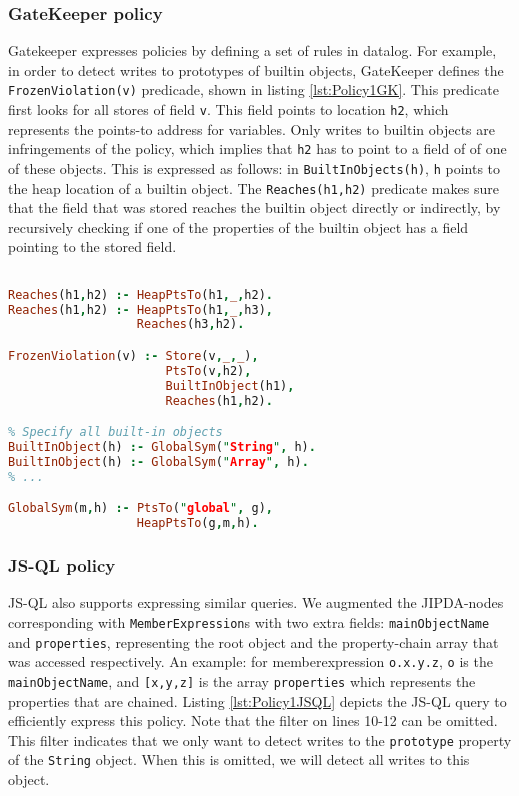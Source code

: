 \subsubsection*{GateKeeper policy}
Gatekeeper expresses policies by defining a set of rules in datalog. For example, in order to detect writes to prototypes of builtin objects, GateKeeper defines the \texttt{FrozenViolation(v)} predicade, shown in listing \ref{lst:Policy1GK}. This predicate first looks for all stores of field \texttt{v}. This field points to location \texttt{h2}, which represents the points-to address for variables. Only writes to builtin objects are infringements of the policy, which implies that \texttt{h2} has to point to a field of of one of these objects. This is expressed as follows: in \texttt{BuiltInObjects(h)}, \texttt{h} points to the heap location of a builtin object. The \texttt{Reaches(h1,h2)} predicate makes sure that the field that was stored reaches the builtin object directly or indirectly, by recursively checking if one of the properties of the builtin object has a field pointing to the stored field.

\begin{lstlisting}[label={lst:Policy1GK},language=Prolog,caption=Policy 1 in GateKeeper,mathescape=true]  % float=t?

Reaches(h1,h2) :- HeapPtsTo(h1,_,h2).
Reaches(h1,h2) :- HeapPtsTo(h1,_,h3),
                  Reaches(h3,h2).

FrozenViolation(v) :- Store(v,_,_),
                      PtsTo(v,h2),
                      BuiltInObject(h1),
                      Reaches(h1,h2).

% Specify all built-in objects
BuiltInObject(h) :- GlobalSym("String", h).
BuiltInObject(h) :- GlobalSym("Array", h).
% ...

GlobalSym(m,h) :- PtsTo("global", g),
                  HeapPtsTo(g,m,h).

\end{lstlisting}

\subsubsection*{JS-QL policy}
JS-QL also supports expressing similar queries. We augmented the JIPDA-nodes corresponding with \texttt{MemberExpression}s with two extra fields: \texttt{mainObjectName} and \texttt{properties}, representing the root object and the property-chain array that was accessed respectively. An example: for memberexpression \texttt{o.x.y.z}, \texttt{o} is the \texttt{mainObjectName}, and \texttt{[x,y,z]} is the array \texttt{properties} which represents the properties that are chained. Listing \ref{lst:Policy1JSQL} depicts the JS-QL query to efficiently express this policy. Note that the filter on lines 10-12 can be omitted. This filter indicates that we only want to detect writes to the \texttt{prototype} property of the \texttt{String} object. When this is omitted, we will detect all writes to this object.

